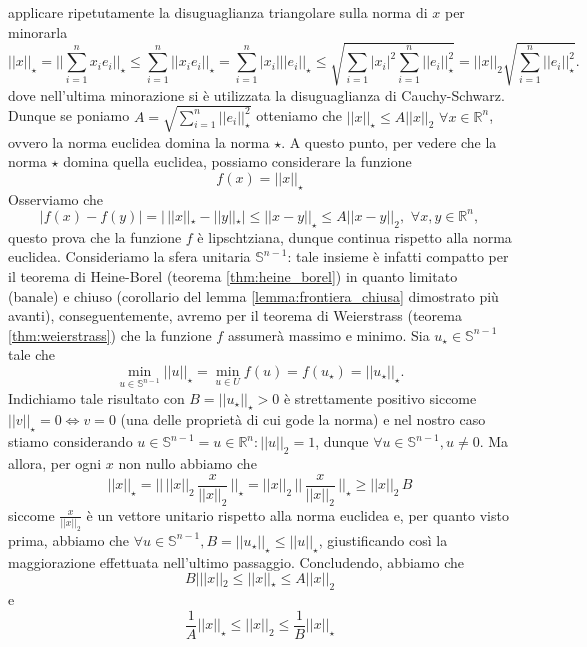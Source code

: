     applicare ripetutamente la disuguaglianza triangolare sulla norma di $x$ per minorarla
    \[
    ||x||_{\star} = ||\sum_{i=1}^n x_i e_i ||_{\star} \leq \sum_{i=1}^n ||x_i e_i||_{\star} = \sum_{i=1}^n |x_i| ||e_i||_{\star} \leq \sqrt{\sum_{i=1} |x_i|^2 \sum_{i=1}^n ||e_i||^2_{\star}} = ||x||_2 \sqrt{\sum_{i=1}^n ||e_i||^2_{\star}}.
    \]
    dove nell'ultima minorazione si è utilizzata la disuguaglianza di Cauchy-Schwarz. \\
    Dunque se poniamo $A = \sqrt{\sum\limits_{i=1}^n ||e_i||^2_{\star}}$ otteniamo che $||x||_{\star} \leq A||x||_2 \, \, \forall x \in \mathbb{R}^n$, ovvero la norma euclidea domina la norma $\star$. A questo punto, per vedere che la norma $\star$ domina quella euclidea, possiamo considerare la funzione
    \[
    f(x) = ||x||_{\star}
    \]
    Osserviamo che
    \[
    |f(x) - f(y)| = | \, ||x||_{\star} - ||y||_{\star}| \leq ||x-y||_{\star} \leq A||x-y||_2, \, \, \forall x, y \in \mathbb{R}^n,
    \]
    questo prova che la funzione $f$ è lipschtziana, dunque continua rispetto alla norma euclidea. Consideriamo la sfera unitaria $\mathbb{S}^{n-1}$: tale insieme è infatti compatto per il teorema di Heine-Borel (teorema \ref{thm:heine_borel}) in quanto limitato (banale) e chiuso (corollario del lemma \ref{lemma:frontiera_chiusa} dimostrato più avanti), conseguentemente, avremo per il teorema di Weierstrass (teorema \ref{thm:weierstrass}) che 
    la funzione $f$ assumerà massimo e minimo. Sia $u_{\star} \in \mathbb{S}^{n-1}$ tale che
    \[
    \min_{u \in \mathbb{S}^{n-1}} ||u||_{\star} = \min_{u \in U} f(u) = f(u_{\star}) = ||u_{\star}||_{\star}.
    \]
    Indichiamo tale risultato con $B = ||u_{\star}||_{\star} > 0$ è strettamente positivo siccome $||v||_{\star} = 0 \iff v = 0$ (una delle proprietà di cui gode la norma) e nel nostro caso stiamo considerando $u \in \mathbb{S}^{n-1} = {u \in \mathbb{R}^n : ||u||_2 = 1}$, dunque $\forall u \in \mathbb{S}^{n-1}, u \neq 0$. Ma allora, per ogni $x$ non nullo abbiamo che
    \[
    ||x||_{\star} = || \, ||x||_2 \, \frac{x}{||x||_2} \, ||_{\star} = ||x||_2 \, || \, \frac{x}{||x||_2} \, ||_{\star} \geq ||x||_2 \, B
    \]
    siccome $\frac{x}{||x||_2}$ è un vettore unitario rispetto alla norma euclidea e, per quanto visto prima, abbiamo che $\forall u \in \mathbb{S}^{n-1}, B = ||u_{\star}||_{\star} \leq ||u||_{\star}$, giustificando così la maggiorazione effettuata nell'ultimo passaggio. Concludendo, abbiamo che
    \[
        B |||x||_2 \leq ||x||_{\star} \leq A ||x||_2
    \]
    e
    \[
        \frac{1}{A} ||x||_{\star} \leq ||x||_2 \leq \frac{1}{B} ||x||_{\star}
    \]
